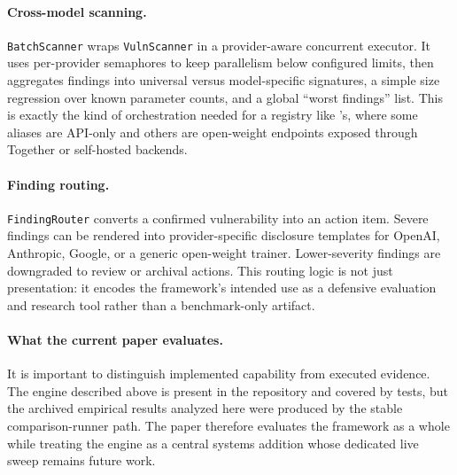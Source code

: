 \paragraph{Cross-model scanning.}
\texttt{BatchScanner} wraps \texttt{VulnScanner} in a provider-aware concurrent
executor. It uses per-provider semaphores to keep parallelism below configured
limits, then aggregates findings into universal versus model-specific
signatures, a simple size regression over known parameter counts, and a global
``worst findings'' list. This is exactly the kind of orchestration needed for a
registry like \system's, where some aliases are API-only and others are
open-weight endpoints exposed through Together or self-hosted backends.

\paragraph{Finding routing.}
\texttt{FindingRouter} converts a confirmed vulnerability into an action item.
Severe findings can be rendered into provider-specific disclosure templates for
OpenAI, Anthropic, Google, or a generic open-weight trainer. Lower-severity
findings are downgraded to review or archival actions. This routing logic is
not just presentation: it encodes the framework's intended use as a defensive
evaluation and research tool rather than a benchmark-only artifact.

\paragraph{What the current paper evaluates.}
It is important to distinguish implemented capability from executed evidence.
The engine described above is present in the repository and covered by tests,
but the archived empirical results analyzed here were produced by the stable
comparison-runner path. The paper therefore evaluates the framework as a whole
while treating the engine as a central systems addition whose dedicated live
sweep remains future work.
